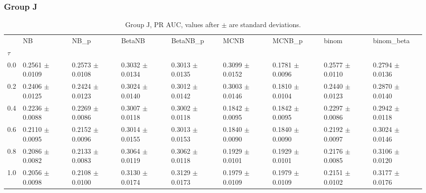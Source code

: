 \subsubsection*{Group J}
\begin{table}[H]
\centering
\begin{adjustbox}{max width=\linewidth}
\begin{tabular}{lllllllll}
\toprule
 & NB & NB\_p & BetaNB & BetaNB\_p & MCNB & MCNB\_p & binom & binom\_beta \\
$\tau$ &  &  &  &  &  &  &  &  \\
\midrule
0.0 & 0.2561 $\pm$ 0.0109 & 0.2573 $\pm$ 0.0108 & 0.3032 $\pm$ 0.0134 & 0.3013 $\pm$ 0.0135 & 0.3099 $\pm$ 0.0152 & 0.1781 $\pm$ 0.0096 & 0.2577 $\pm$ 0.0110 & 0.2794 $\pm$ 0.0136 \\
0.2 & 0.2406 $\pm$ 0.0125 & 0.2424 $\pm$ 0.0123 & 0.3024 $\pm$ 0.0140 & 0.3012 $\pm$ 0.0142 & 0.3003 $\pm$ 0.0146 & 0.1810 $\pm$ 0.0104 & 0.2440 $\pm$ 0.0123 & 0.2870 $\pm$ 0.0140 \\
0.4 & 0.2236 $\pm$ 0.0088 & 0.2269 $\pm$ 0.0086 & 0.3007 $\pm$ 0.0118 & 0.3002 $\pm$ 0.0118 & 0.1842 $\pm$ 0.0095 & 0.1842 $\pm$ 0.0095 & 0.2297 $\pm$ 0.0086 & 0.2942 $\pm$ 0.0118 \\
0.6 & 0.2110 $\pm$ 0.0095 & 0.2152 $\pm$ 0.0096 & 0.3014 $\pm$ 0.0155 & 0.3013 $\pm$ 0.0153 & 0.1840 $\pm$ 0.0090 & 0.1840 $\pm$ 0.0090 & 0.2192 $\pm$ 0.0097 & 0.3024 $\pm$ 0.0146 \\
0.8 & 0.2086 $\pm$ 0.0082 & 0.2133 $\pm$ 0.0083 & 0.3064 $\pm$ 0.0119 & 0.3062 $\pm$ 0.0118 & 0.1929 $\pm$ 0.0101 & 0.1929 $\pm$ 0.0101 & 0.2176 $\pm$ 0.0085 & 0.3106 $\pm$ 0.0120 \\
1.0 & 0.2056 $\pm$ 0.0098 & 0.2108 $\pm$ 0.0100 & 0.3130 $\pm$ 0.0174 & 0.3129 $\pm$ 0.0173 & 0.1979 $\pm$ 0.0109 & 0.1979 $\pm$ 0.0109 & 0.2151 $\pm$ 0.0102 & 0.3177 $\pm$ 0.0176 \\
\bottomrule
\end{tabular}

\end{adjustbox}
\caption{Group J, PR AUC, values after $\pm$ are standard deviations.}
\end{table}

